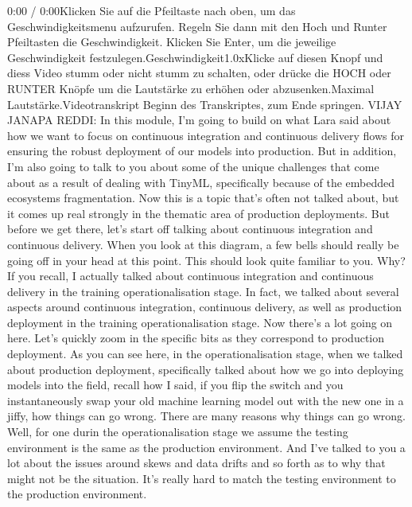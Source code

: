 {{{{{     0:00 / 0:00Klicken Sie auf die Pfeiltaste nach oben, um das Geschwindigkeitsmenu aufzurufen. Regeln Sie dann mit den Hoch und Runter Pfeiltasten die Geschwindigkeit. Klicken Sie Enter, um die jeweilige Geschwindigkeit festzulegen.Geschwindigkeit1.0xKlicke auf diesen Knopf und diess Video stumm oder nicht stumm zu schalten, oder drücke die HOCH oder RUNTER Knöpfe um die Lautstärke zu erhöhen oder abzusenken.Maximal Lautstärke.Videotranskript
     Beginn des Transkriptes, zum Ende springen.
     VIJAY JANAPA REDDI: In this module, I'm going
     to build on what Lara said about how we want to focus on continuous integration
     and continuous delivery flows for ensuring
     the robust deployment of our models into production.
     But in addition, I'm also going to talk to you
     about some of the unique challenges that come about
     as a result of dealing with TinyML, specifically
     because of the embedded ecosystems fragmentation.
     Now this is a topic that's often not talked about,
     but it comes up real strongly in the thematic area
     of production deployments.
     But before we get there, let's start off talking about continuous integration
     and continuous delivery.
     When you look at this diagram, a few bells
     should really be going off in your head at this point.
     This should look quite familiar to you.
     Why?
     If you recall, I actually talked about continuous integration
     and continuous delivery in the training operationalisation stage.
     In fact, we talked about several aspects around continuous integration,
     continuous delivery, as well as production deployment in the training
     operationalisation stage.
     Now there's a lot going on here.
     Let's quickly zoom in the specific bits as they
     correspond to production deployment.
     As you can see here, in the operationalisation stage,
     when we talked about production deployment,
     specifically talked about how we go into deploying models into the field,
     recall how I said, if you flip the switch
     and you instantaneously swap your old machine learning model out
     with the new one in a jiffy, how things can go wrong.
     There are many reasons why things can go wrong.
     Well, for one durin the operationalisation
     stage we assume the testing environment is
     the same as the production environment.
     And I've talked to you a lot about the issues around skews and data drifts
     and so forth as to why that might not be the situation.
     It's really hard to match the testing environment
     to the production environment.
}}}}}
